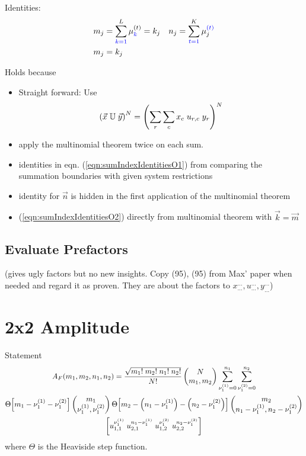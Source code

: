 \documentclass[
	english,
	a4paper,
	fontsize=10pt,
	parskip=half,
	titlepage=true,
	DIV=12,
	final
]{scrreprt}
\begin{document}
Identities:
\begin{align}
	m_j &= \sum_{{\color{blue} k=1}}^{L} \mu_{{\color{blue} k}}^{(t)} = k_j
&
	n_j &= \sum_{{\color{blue} t=1}}^{K} \mu_{j}^{{\color{blue} (t)}}
	\label{eqn:sumIndexIdentitiesO1}
\\
	m_j &= k_j
	\label{eqn:sumIndexIdentitiesO2}
\end{align}

Holds because
\begin{itemize}
\item Straight forward: Use
	\begin{equation}
		\qty( \vec{x} \; \mathbb{U} \; \vec{y} )^N
		=
		\qty( \sum_{r} \sum_{c} x_c \; u_{r,c} \; y_r )^N
	\end{equation}

\item apply the multinomial theorem twice on each sum.
\item identities in eqn. (\ref{eqn:sumIndexIdentitiesO1}) from comparing the summation boundaries with
	given system restrictions
\item identity for $\vec{n}$ is hidden in the first application of the multinomial theorem
\item (\ref{eqn:sumIndexIdentitiesO2}) directly from multinomial theorem with $\vec{k} = \vec{m}$
\end{itemize}


\subsection{Evaluate Prefactors}
(gives ugly factors but no new insights. Copy (95), (95) from Max' paper when needed and regard it as proven. They are about the factors to $x_{\ldots}^{\ldots}, u_{\ldots}^{\ldots}, y_{\ldots}^{\ldots}$)

\section{2x2 Amplitude}
Statement
\begin{multline}
	A_F (m_1, m_2, n_1, n_2)
=
	\frac{\sqrt{m_1! \; m_2! \; n_1! \; n_2!}}{N!}
	\begin{pmatrix}
		N \\ m_1, m_2
	\end{pmatrix}
	\sum_{\nu_1^{(1)} = 0}^{n_1}
	\sum_{\nu_1^{(2)} = 0}^{n_2}
\\
	\Theta\qty[ m_1 - \nu_1^{(1)} - \nu_1^{(2)} ]
	\begin{pmatrix}
		m_1 \\ \nu_1^{(1)}, \nu_1^{(2)}
	\end{pmatrix}
	\Theta\qty[ m_2 - \qty(n_1 - \nu_1^{(1)})  - \qty(n_2 - \nu_1^{(2)}) ]
	\begin{pmatrix}
		m_2 \\ n_1 - \nu_1^{(1)} , n_2 - \nu_1^{(2)}
	\end{pmatrix}
\\
	\qty[
		u_{1,1}^{\nu_1^{(1)}} \; u_{2,1}^{n_1 - \nu_1^{(1)}} \;
		u_{1,2}^{\nu_1^{(2)}} \; u_{2,2}^{n_2 - \nu_1^{(2)}}
	]
\end{multline}
where $\Theta$ is the Heaviside step function.
\end{document}
